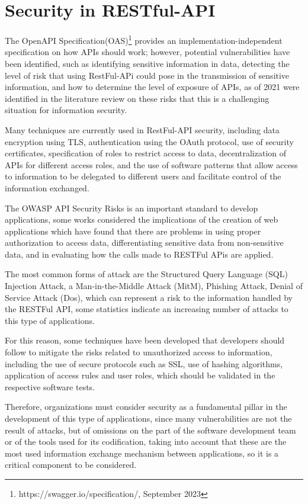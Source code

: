 \section{Security in RESTful-API}

 The OpenAPI Specification(OAS)\footnote{https://swagger.io/specification/, September 2023} provides an implementation-independent specification on how APIs should work; however, potential vulnerabilities have been identified, such as identifying sensitive information in data, detecting the level of risk that using RestFul-APi could pose in the transmission of sensitive information, and how to determine the level of exposure of APIs, as of 2021 were identified in the literature review on these risks that this is a challenging situation for information security\cite{Sun}.

Many techniques are currently used in RestFul-API security\cite{Siriwardena2020}, including data encryption using TLS, authentication using the OAuth protocol, use of security certificates, specification of roles to restrict access to data, decentralization of APIs for different access roles, and the use of software patterns that allow access to information to be delegated to different users and facilitate control of the information exchanged.

The OWASP API Security Risks is an important standard to develop applications, some works considered the implications of the creation of web applications\cite{Muhammad2021,Idris_Syarif_Winarno_2022,Cheh2021} which have found that there are problems in using proper authorization to access data, differentiating sensitive data from non-sensitive data, and in evaluating how the calls made to RESTFul APis are applied.


The most common forms of attack\cite{Modi2022}
 are the Structured Query Language (SQL) Injection Attack, a Man-in-the-Middle Attack (MitM), Phishing Attack, Denial of Service Attack (Dos), which can represent a risk to the information handled by the RESTFul API, some statistics indicate an increasing number of attacks to this type of applications.

For this reason, some techniques have been developed\cite{Munsch2021,zenodo2023} that developers should follow to mitigate the risks related to unauthorized access to information, including the use of secure protocols such as SSL, use of hashing algorithms, application of access rules and user roles, which should be validated in the respective software tests.

Therefore, organizations must consider security as a fundamental pillar in the development of this type of applications, since many vulnerabilities are not the result of attacks, but of omissions on the part of the software development team or of the tools used for its codification, taking into account that these are the most used information exchange mechanism between applications, so it is a critical component to be considered. 

